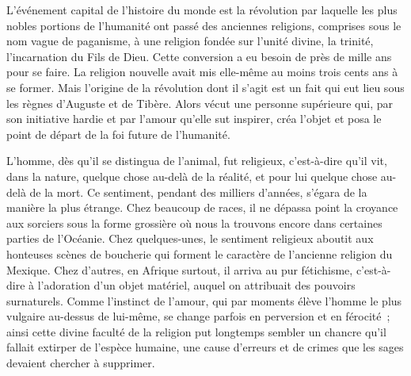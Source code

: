 \documentclass[french,twoside]{book} %
\newcommand\chaptercont{} %
\begin{document}
\chaptercont
\noindent L’événement capital de l’histoire du monde est la révolution par laquelle les plus nobles portions de l’humanité ont passé des anciennes religions, comprises sous le nom vague de paganisme, à une religion fondée sur l’unité divine, la trinité, l’incarnation du Fils de Dieu. Cette conversion a eu besoin de près de mille ans pour se faire. La religion nouvelle avait mis elle-même au moins trois cents ans à se former. Mais l’origine de la révolution dont il s’agit est un fait qui eut lieu sous les règnes d’Auguste et de Tibère. Alors vécut une personne supérieure qui, par son initiative hardie et par l’amour qu’elle sut inspirer, créa l’objet et posa le point de départ de la foi future de l’humanité.\par
L’homme, dès qu’il se distingua de l’animal, fut religieux, c’est-à-dire qu’il vit, dans la nature, quelque chose au-delà de la réalité, et pour lui quelque chose au-delà de la mort. Ce sentiment, pendant des milliers d’années, s’égara de la manière la plus étrange. Chez beaucoup de races, il ne dépassa point la croyance aux sorciers sous la forme grossière où nous la trouvons encore dans certaines parties de l’Océanie. Chez quelques-unes, le sentiment religieux aboutit aux honteuses scènes de boucherie qui forment le caractère de l’ancienne religion du Mexique. Chez d’autres, en Afrique surtout, il arriva au pur fétichisme, c’est-à-dire à l’adoration d’un objet matériel, auquel on attribuait des pouvoirs surnaturels. Comme l’instinct de l’amour, qui par moments élève l’homme le plus vulgaire au-dessus de lui-même, se change parfois en perversion et en férocité ; ainsi cette divine faculté de la religion put longtemps sembler un chancre qu’il fallait extirper de l’espèce humaine, une cause d’erreurs et de crimes que les sages devaient chercher à supprimer.\par
\end{document}
